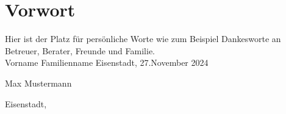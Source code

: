 

\thispagestyle{plain}
\chapter{Vorwort}

Hier ist der Platz für persönliche Worte wie zum Beispiel Dankesworte an Betreuer, Berater, Freunde und Familie.\\
Vorname Familienname
Eisenstadt, 27.November 2024


\vspace{2cm}


\begin{flushleft}
    Max Mustermann
\end{flushleft}
Eisenstadt, \thesisDate

